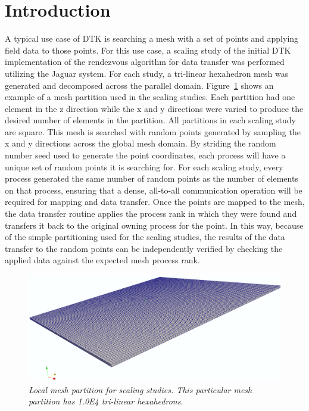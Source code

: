 \documentclass[note]{TechNote}
\begin{document}
\section{Introduction}
A typical use case of DTK is searching a mesh with a set of points and
applying field data to those points. For this use case, a scaling
study of the initial DTK implementation of the rendezvous algorithm
for data transfer was performed utilizing the Jaguar system. For each
study, a tri-linear hexahedron mesh was generated and decomposed
across the parallel domain. Figure~\ref{fig:mesh_partition} shows an
example of a mesh partition used in the scaling studies. Each
partition had one element in the z direction while the x and y
directions were varied to produce the desired number of elements in
the partition. All partitions in each scaling study are square. This
mesh is searched with random points generated by sampling the x and y
directions across the global mesh domain.  By striding the random
number seed used to generate the point coordinates, each process will
have a unique set of random points it is searching for. For each
scaling study, every process generated the same number of random
points as the number of elements on that process, ensuring that a
dense, all-to-all communication operation will be required for mapping
and data transfer. Once the points are mapped to the mesh, the data
transfer routine applies the process rank in which they were found and
transfers it back to the original owning process for the point. In
this way, because of the simple partitioning used for the scaling
studies, the results of the data transfer to the random points can be
independently verified by checking the applied data against the
expected mesh process rank.

\begin{figure}[htpb!]
  \centering
  \includegraphics[width=5.5in]{mesh.png}
  \caption{\sl Local mesh partition for scaling studies. This
    particular mesh partition has 1.0E4 tri-linear hexahedrons.}
  \label{fig:mesh_partition}
\end{figure}
\end{document}
